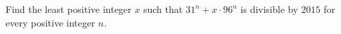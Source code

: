 Find the least positive integer $x$ such that $31^n+x\cdot96^n$ is divisible by $2015$ for every positive integer $n$.
